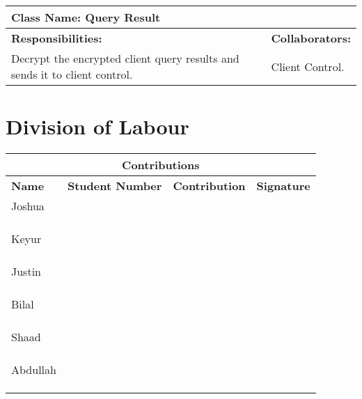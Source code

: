 \documentclass[]{article}
\begin{document}
\begin{enumerate}[a)]
\begin{table}[ht]
\begin{tabular}{|p{5cm}|p{5cm}|}
		\hline				
		\end{tabular}
	\end{table}

\begin{table}[ht]
		\centering
		\begin{tabular}{|p{5cm}|p{5cm}|}
		\hline 
		 \multicolumn{2}{|l|}{\textbf{Class Name: Query Result}} \\
		\hline
		\textbf{Responsibilities: } & \textbf{Collaborators:} \\
		\hline
		Decrypt the encrypted client query results and sends it to client control.
		\vspace{1in} & Client Control.\\
		
		\hline				
		\end{tabular}
	\end{table}
\end{enumerate}

\newpage
\appendix
\section{Division of Labour} \label{dlabour}
\begin{tabular}{ |p{3cm}||p{2cm}|p{6cm}|p{1.5cm}|  }
 \hline
 \multicolumn{4}{|c|}{Contributions} \\
 \hline
 \textbf{Name}& \textbf{Student Number}& \textbf{Contribution}& \textbf{Signature}\\
 \hline
 Joshua &     &&   \\ 
 &&&   \\
 &&&   \\
 &&&   \\
 \hline
 Keyur  &    &  &\\
 &&&   \\
 &&&   \\
 &&&   \\
 \hline
 Justin &&& \\
 &&&   \\
 &&&   \\
 &&&   \\
 \hline
 Bilal & & & \\
 &&&   \\
 &&&   \\
 &&&   \\
 \hline
 Shaad &  & &\\
 &&&   \\
 &&&   \\
 &&&   \\
 \hline
 Abdullah & &  &\\
 &&&   \\
 &&&   \\
 &&&   \\
 \hline
\end{tabular}
\end{document}
